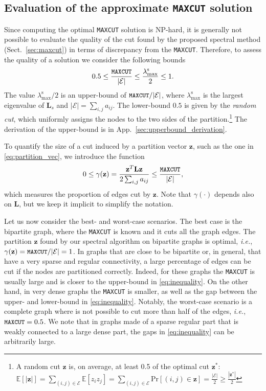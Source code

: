 \documentclass[journal]{IEEEtran}
\def\z{{\mathbf z}}
\def\L{{\mathbf L}}
\newcommand{\maxcut}{\texttt{\small{MAXCUT}}}
\begin{document}
\subsection{Evaluation of the approximate \maxcut{} solution}
\label{sec:maxcut_eval}
Since computing the optimal \maxcut{} solution is NP-hard, it is generally not possible to evaluate the quality of the cut found by the proposed spectral method (Sect.~\ref{sec:maxcut}) in terms of discrepancy from the \maxcut{}.
Therefore, to assess the quality of a solution we consider the following bounds
\begin{equation}
    \label{eq:inequality}
    0.5 \leq \frac{\maxcut{}}{|\mathcal{E}|} \leq \frac{\lambda^\text{s}_\text{max}}{2} \leq 1.
\end{equation}
The value $\lambda^\text{s}_\text{max}/2$ is an upper-bound of $\maxcut{}/|\mathcal{E}|$, where $\lambda^\text{s}_\text{max}$ is the largest eigenvalue of $\L_s$ and $|\mathcal{E}| = \sum_{i,j} a_{ij}$.
The lower-bound $0.5$ is given by the \textit{random cut}, which uniformly assigns the nodes to the two sides of the partition.\footnote{\label{note_rc}A random cut $\z$ is, on average, at least 0.5 of the optimal cut $\z^*$: $\mathbb{E}[|\z|] = \sum_{(i,j) \in \mathcal{E}} \mathbb{E}[z_i z_j] = \sum_{(i,j) \in \mathcal{E}} \text{Pr}[(i,j) \in \z] = \frac{|\mathcal{E}|}{2} \geq \frac{|\z^*|}{2}$} 
The derivation of the upper-bound is in App.~\ref{sec:upperbound_derivation}.

To quantify the size of a cut induced by a partition vector $\z$, such as the one in \eqref{eq:partition_vec}, we introduce the function
\begin{equation}
    \label{eq:cut_size}
    0 \leq \gamma(\z) = \frac{\z^T \L \z}{2\sum_{i,j} a_{ij}} \leq \frac{\maxcut{}}{|\mathcal{E}|},
\end{equation}
which measures the proportion of edges cut by $\z$.
Note that $\gamma(\cdot)$ depends also on $\L$, but we keep it implicit to simplify the notation.

Let us now consider the best- and worst-case scenarios.
The best case is the bipartite graph, where the \maxcut{} is known and it cuts all the graph edges.
The partition $\z$ found by our spectral algorithm on bipartite graphs is optimal, \textit{i.e.}, $\gamma(\z) = \maxcut{}/|\mathcal{E}| = 1$.
In graphs that are close to be bipartite or, in general, that have a very sparse and regular connectivity, a large percentage of edges can be cut if the nodes are partitioned correctly.
Indeed, for these graphs the \maxcut{} is usually large and is closer to the upper-bound in \eqref{eq:inequality}.
On the other hand, in very dense graphs the \maxcut{} is smaller, as well as the gap between the upper- and lower-bound in \eqref{eq:inequality}. 
Notably, the worst-case scenario is a complete graph where is not possible to cut more than half of the edges, \textit{i.e.}, $\maxcut{}=0.5$.
We note that in graphs made of a sparse regular part that is weakly connected to a large dense part, the gaps in \eqref{eq:inequality} can be arbitrarily large.
\end{document}
